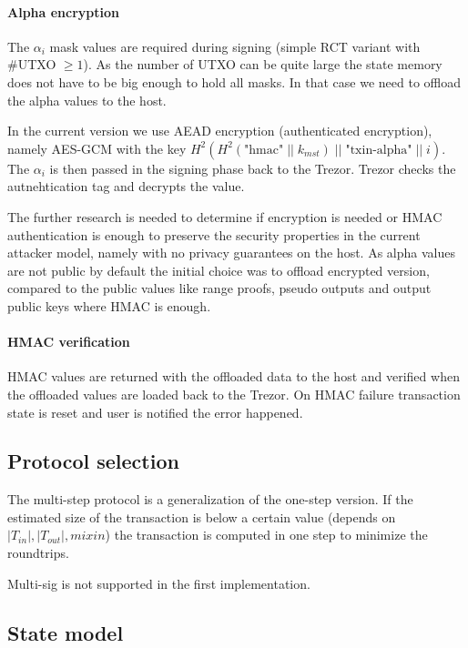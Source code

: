 \documentclass[]{article}
\begin{document}
\paragraph{Alpha encryption}
The $\alpha_i$ mask values are required during signing (simple RCT variant with \#UTXO $\ge 1$). As the number of UTXO can be quite large the state memory does not have to be big enough to hold all masks. In that case we need to offload the alpha values to the host. 

In the current version we use AEAD encryption (authenticated encryption), namely AES-GCM with the key $H^2\left(H^2\left(\text{"hmac"} \; || \; k_{mst}\right) \; || \; \text{"txin-alpha"} \; || \; i\right)$. The $\alpha_i$ is then passed in the signing phase back to the Trezor. Trezor checks the autnehtication tag and decrypts the value. 

The further research is needed to determine if encryption is needed or HMAC authentication is enough to preserve the security properties in the current attacker model, namely with no privacy guarantees on the host. As alpha values are not public by default the initial choice was to offload encrypted version, compared to the public values like range proofs, pseudo outputs and output public keys where HMAC is enough.

\paragraph{HMAC verification}
HMAC values are returned with the offloaded data to the host and verified when the offloaded values are loaded back to the Trezor. 
On HMAC failure transaction state is reset and user is notified the error happened.

\subsection{Protocol selection}
The multi-step protocol is a generalization of the one-step version.
If the estimated size of the transaction is below a certain value (depends on $|T_{in}|, |T_{out}|, mixin$) the transaction is computed in one step to minimize the roundtrips. 

Multi-sig is not supported in the first implementation.

\subsection{State model}
\end{document}
